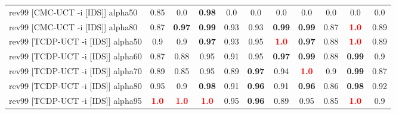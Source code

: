 \documentclass{article}
\begin{document}
\begin{tabular}{|l|r@{$\pm$}rr@{$\pm$}rr@{$\pm$}rr@{$\pm$}rr@{$\pm$}rr@{$\pm$}rr@{$\pm$}rr@{$\pm$}rr@{$\pm$}rr@{$\pm$}r|}
\hline
rev99 [CMC-UCT -i [IDS]] alpha50
& \multicolumn{2}{c}{0.85}
& \multicolumn{2}{c}{0.0}
& \multicolumn{2}{c}{\textbf{0.98}}
& \multicolumn{2}{c}{0.0}
& \multicolumn{2}{c}{0.0}
& \multicolumn{2}{c}{0.0}
& \multicolumn{2}{c}{0.0}
& \multicolumn{2}{c}{0.0}
& \multicolumn{2}{c}{0.0}
& \multicolumn{2}{c|}{0.0}
\\
rev99 [CMC-UCT -i [IDS]] alpha80
& \multicolumn{2}{c}{0.87}
& \multicolumn{2}{c}{\textbf{0.97}}
& \multicolumn{2}{c}{\textbf{0.99}}
& \multicolumn{2}{c}{0.93}
& \multicolumn{2}{c}{0.93}
& \multicolumn{2}{c}{\textbf{0.99}}
& \multicolumn{2}{c}{\textbf{0.99}}
& \multicolumn{2}{c}{0.87}
& \multicolumn{2}{c}{\textbf{\textcolor{red}{1.0}}}
& \multicolumn{2}{c|}{0.89}
\\
rev99 [TCDP-UCT -i [IDS]] alpha50
& \multicolumn{2}{c}{0.9}
& \multicolumn{2}{c}{0.9}
& \multicolumn{2}{c}{\textbf{0.97}}
& \multicolumn{2}{c}{0.93}
& \multicolumn{2}{c}{0.95}
& \multicolumn{2}{c}{\textbf{\textcolor{red}{1.0}}}
& \multicolumn{2}{c}{\textbf{0.97}}
& \multicolumn{2}{c}{0.88}
& \multicolumn{2}{c}{\textbf{\textcolor{red}{1.0}}}
& \multicolumn{2}{c|}{0.89}
\\
rev99 [TCDP-UCT -i [IDS]] alpha60
& \multicolumn{2}{c}{0.87}
& \multicolumn{2}{c}{0.88}
& \multicolumn{2}{c}{0.95}
& \multicolumn{2}{c}{0.91}
& \multicolumn{2}{c}{0.95}
& \multicolumn{2}{c}{\textbf{0.97}}
& \multicolumn{2}{c}{\textbf{0.99}}
& \multicolumn{2}{c}{0.88}
& \multicolumn{2}{c}{\textbf{0.99}}
& \multicolumn{2}{c|}{0.9}
\\
rev99 [TCDP-UCT -i [IDS]] alpha70
& \multicolumn{2}{c}{0.89}
& \multicolumn{2}{c}{0.85}
& \multicolumn{2}{c}{0.95}
& \multicolumn{2}{c}{0.89}
& \multicolumn{2}{c}{\textbf{0.97}}
& \multicolumn{2}{c}{0.94}
& \multicolumn{2}{c}{\textbf{\textcolor{red}{1.0}}}
& \multicolumn{2}{c}{0.9}
& \multicolumn{2}{c}{\textbf{0.99}}
& \multicolumn{2}{c|}{0.87}
\\
rev99 [TCDP-UCT -i [IDS]] alpha80
& \multicolumn{2}{c}{0.95}
& \multicolumn{2}{c}{0.9}
& \multicolumn{2}{c}{\textbf{0.98}}
& \multicolumn{2}{c}{0.91}
& \multicolumn{2}{c}{\textbf{0.96}}
& \multicolumn{2}{c}{0.91}
& \multicolumn{2}{c}{\textbf{0.96}}
& \multicolumn{2}{c}{0.86}
& \multicolumn{2}{c}{\textbf{0.98}}
& \multicolumn{2}{c|}{0.92}
\\
rev99 [TCDP-UCT -i [IDS]] alpha95
& \multicolumn{2}{c}{\textbf{\textcolor{red}{1.0}}}
& \multicolumn{2}{c}{\textbf{\textcolor{red}{1.0}}}
& \multicolumn{2}{c}{\textbf{\textcolor{red}{1.0}}}
& \multicolumn{2}{c}{0.95}
& \multicolumn{2}{c}{\textbf{0.96}}
& \multicolumn{2}{c}{0.89}
& \multicolumn{2}{c}{0.95}
& \multicolumn{2}{c}{0.85}
& \multicolumn{2}{c}{\textbf{\textcolor{red}{1.0}}}
& \multicolumn{2}{c|}{0.9}
\\
\hline
\end{tabular}%
\end{document}
